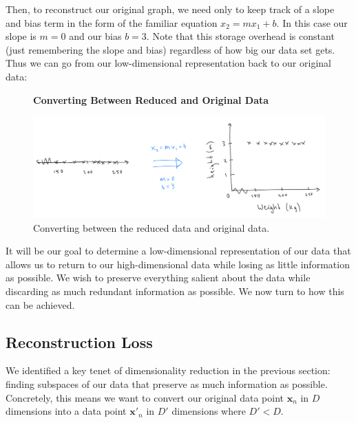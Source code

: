 Then, to reconstruct our original graph, we need only to keep track of a slope and bias term in the form of the familiar equation $x_2 = mx_1 + b$. In this case our slope is $m=0$ and our bias $b=3$. Note that this storage overhead is constant (just remembering the slope and bias) regardless of how big our data set gets. Thus we can go from our low-dimensional representation back to our original data:

\begin{figure}
    \centering
    \textbf{Converting Between Reduced and Original Data}\par\medskip
    \includegraphics[width=0.5\paperwidth]{../DimensionalityReduction/fig/bear-conversion.png}
    \caption{Converting between the reduced data and original data.}
    \label{fig:bear-conversion}
\end{figure}

It will be our goal to determine a low-dimensional representation of our data that allows us to return to our high-dimensional data while losing as little information as possible. We wish to preserve everything salient about the data while discarding as much redundant information as possible. We now turn to how this can be achieved.

\subsection{Reconstruction Loss}
We identified a key tenet of dimensionality reduction in the previous section: finding subspaces of our data that preserve as much information as possible. Concretely, this means we want to convert our original data point $\textbf{x}_n$ in $D$ dimensions into a data point $\textbf{x}'_{n}$ in $D'$ dimensions where $D' < D$. 


